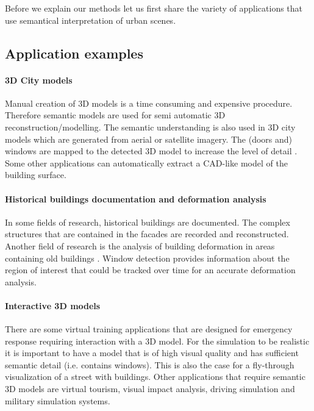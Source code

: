 Before we explain our methods let us first share the variety of applications 
that use semantical interpretation of urban scenes.  \\

\subsection{Application examples}
\paragraph{3D City models} 
	Manual creation of 3D models is a time consuming and expensive procedure.
	Therefore semantic models are used for semi automatic 3D
	reconstruction/modelling.
	The semantic understanding is also used in 3D city models which are
	generated from aerial or satellite imagery.  The (doors and) windows are mapped to the detected 3D model to increase the level of detail \cite{Muller_procedural2}. 
	Some other applications can automatically extract a CAD-like model of
	the building surface.

\paragraph{Historical buildings documentation and deformation analysis}
	In some fields of research, historical buildings are documented.  The complex
	structures that are contained in the facades are recorded and reconstructed.
	Another field of research is the analysis of building deformation in areas
	containing old buildings \cite{deformation}.
	 Window detection provides information about the
	region of interest that could be tracked over time for an accurate
	deformation analysis.

\paragraph{Interactive 3D models}
	There are some virtual training applications that are designed for
	emergency response requiring interaction with a 3D model.  
	For the simulation to be realistic it is important to have a model that is
	of high visual quality and has sufficient semantic detail (i.e. contains
	windows).  This is also the case for a fly-through visualization of a street with
	buildings.
	Other applications that require semantic 3D models are virtual tourism,
	visual impact analysis, driving simulation and military simulation systems.

